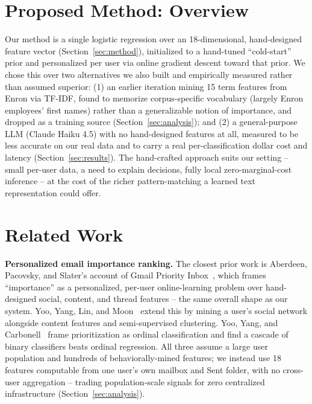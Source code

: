 \documentclass[twoside,twocolumn,10pt]{article}
\begin{document}
\section{Proposed Method: Overview}

Our method is a single logistic regression over an 18-dimensional, hand-designed feature vector (Section~\ref{sec:method}), initialized to a hand-tuned ``cold-start'' prior and personalized per user via online gradient descent toward that prior. We chose this over two alternatives we also built and empirically measured rather than assumed superior: (1) an earlier iteration mining 15 term features from Enron via TF-IDF, found to memorize corpus-specific vocabulary (largely Enron employees' first names) rather than a generalizable notion of importance, and dropped as a training source (Section~\ref{sec:analysis}); and (2) a general-purpose LLM (Claude Haiku 4.5) with no hand-designed features at all, measured to be less accurate on our real data and to carry a real per-classification dollar cost and latency (Section~\ref{sec:results}). The hand-crafted approach suits our setting -- small per-user data, a need to explain decisions, fully local zero-marginal-cost inference -- at the cost of the richer pattern-matching a learned text representation could offer.

\section{Related Work}

\textbf{Personalized email importance ranking.} The closest prior work is Aberdeen, Pacovsky, and Slater's account of Gmail Priority Inbox~\cite{aberdeen2010gmail}, which frames ``importance'' as a personalized, per-user online-learning problem over hand-designed social, content, and thread features -- the same overall shape as our system. Yoo, Yang, Lin, and Moon~\cite{yoo2009mining} extend this by mining a user's social network alongside content features and semi-supervised clustering. Yoo, Yang, and Carbonell~\cite{yoo2011modeling} frame prioritization as ordinal classification and find a cascade of binary classifiers beats ordinal regression. All three assume a large user population and hundreds of behaviorally-mined features; we instead use 18 features computable from one user's own mailbox and Sent folder, with no cross-user aggregation -- trading population-scale signals for zero centralized infrastructure (Section~\ref{sec:analysis}).
\end{document}
